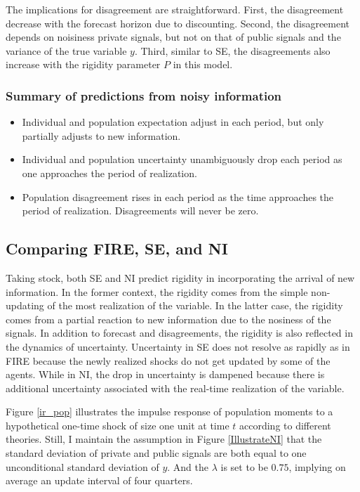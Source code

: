 \documentclass[12pt]{article}
\begin{document}
	The implications for disagreement are straightforward. First, the disagreement decrease with the forecast horizon due to discounting. Second, the disagreement depends on noisiness private signals, but not on that of public signals and the variance of the true variable $y$. Third, similar to SE, the disagreements also increase with the rigidity parameter $P$ in this model.
	
	\subsubsection{Summary of predictions from noisy information}
	
	\begin{itemize}
		\item Individual and population expectation adjust in each period, but only partially adjusts to new information. 
		\item  Individual and population uncertainty unambiguously drop each period as one approaches the period of realization.  
		\item  Population disagreement rises in each period as the time approaches the period of realization. Disagreements will never be zero. 
	\end{itemize}
	
	
	\subsection{Comparing FIRE, SE, and NI}
	
	Taking stock, both SE and NI predict rigidity in incorporating the arrival of new information. In the former context, the rigidity comes from the simple non-updating of the most realization of the variable. In the latter case, the rigidity comes from a partial reaction to new information due to the nosiness of the signals.  In addition to forecast and disagreements, the rigidity is also reflected in the dynamics of uncertainty.  Uncertainty in SE does not resolve as rapidly as in FIRE because the newly realized shocks do not get updated by some of the agents. While in NI, the drop in uncertainty is dampened because there is additional uncertainty associated with the real-time realization of the variable.  
	
	Figure \ref{ir_pop} illustrates the impulse response of population moments to a hypothetical one-time shock of size one unit at time $t$ according to different theories. Still, I maintain the assumption in Figure \ref{IllustrateNI} that the standard deviation of private and public signals are both equal to one unconditional standard deviation of $y$.  And the $\lambda$ is set to be $0.75$, implying on average an update interval of four quarters.  
	
\end{document}
